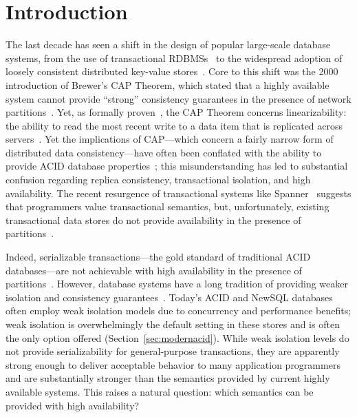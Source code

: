 
\section{Introduction}

The last decade has seen a shift in the design of popular large-scale
database systems, from the use of transactional
RDBMSs~\cite{bernstein-book, gray-isolation, gray-virtues} to the
widespread adoption of loosely consistent distributed key-value
stores~\cite{bigtable, pnuts, dynamo}. Core to this shift was the 2000
introduction of Brewer's CAP Theorem, which stated that a highly
available system cannot provide ``strong'' consistency guarantees in
the presence of network partitions~\cite{brewer-slides}. Yet, as
formally proven~\cite{gilbert-cap}, the CAP Theorem concerns
linearizability: the ability to read the most recent write to a data
item that is replicated across servers~\cite{herlihy-art}. Yet the
implications of CAP---which concern a fairly narrow form of
distributed data consistency---have often been conflated with the
ability to provide ACID database properties~\cite{hn,brewer-slides,
  foundation-article}; this misunderstanding has led to substantial
confusion regarding replica consistency, transactional isolation, and
high availability. The recent resurgence of transactional systems like
Spanner~\cite{spanner} suggests that programmers value transactional
semantics, but, unfortunately, existing transactional data stores do
not provide availability in the presence of
partitions~\cite{middleware-db, foundation-article,
  hstore,spanner,generalizedsnapshot, mdcc, krikellas-bargain, eiger,
  walter, calvin}.

Indeed, serializable transactions---the gold standard of traditional
ACID databases---are not achievable with high availability in the
presence of partitions~\cite{davidson-survey}. However, database
systems have a long tradition of providing weaker isolation and
consistency guarantees~\cite{adya, ansicritique, gray-virtues,
  gray-isolation, kemme-thesis}. Today's ACID and NewSQL databases
often employ weak isolation models due to concurrency and performance
benefits; weak isolation is overwhelmingly the default setting in
these stores and is often the only option offered
(Section~\ref{sec:modernacid}). While weak isolation levels do not
provide serializability for general-purpose transactions, they are
apparently strong enough to deliver acceptable behavior to many
application programmers and are substantially stronger than the
semantics provided by current highly available systems. This raises a
natural question: which semantics can be provided with high
availability?

